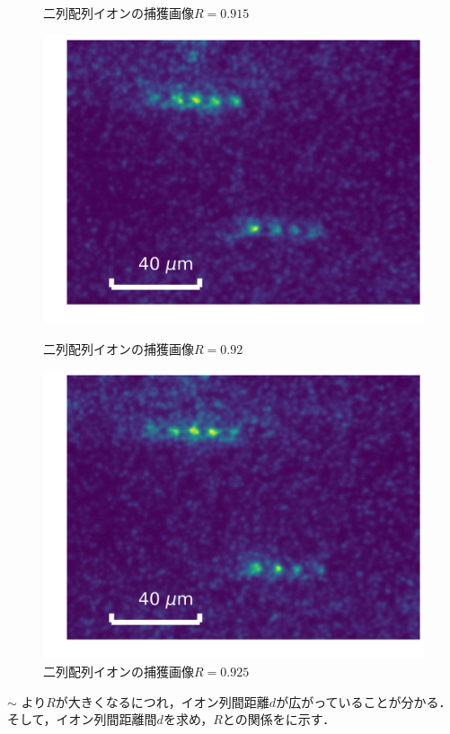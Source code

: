 \begin{figure}[h]
\begin{minipage}{0.33\linewidth}
\begin{center}
			\caption{二列配列イオンの捕獲画像$R = 0.915$}
			\label{fig:2D_0915}
		\end{center}
	\end{minipage}
\end{figure}

\begin{figure}[h]
	\begin{minipage}{0.5\linewidth}
		\begin{center}
			\includegraphics[width = 0.5\columnwidth]{./results/figure/2D_092.jpg}
			\caption{二列配列イオンの捕獲画像$R = 0.92$}
			\label{fig:2D_092}
		\end{center}
	\end{minipage}
	\begin{minipage}{0.5\linewidth}
		\begin{center}
			\includegraphics[width = 0.5\columnwidth]{./results/figure/2D_0925.jpg}
			\caption{二列配列イオンの捕獲画像$R = 0.925$}
			\label{fig:2D_0925}
		\end{center}
	\end{minipage}
\end{figure}

 $\sim$ より$R$が大きくなるにつれ，イオン列間距離$d$が広がっていることが分かる．
%
\clearpage
%
そして，イオン列間距離間$d$を求め，$R$との関係をに示す．

